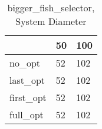 \begin{table}
\caption{bigger\_fish\_selector, System Diameter}
\label{bigger_fish_selector_diam}
\begin{tabular}{lll}
\toprule
 & 50 & 100 \\
\midrule
no\_opt & 52 & 102 \\
last\_opt & 52 & 102 \\
first\_opt & 52 & 102 \\
full\_opt & 52 & 102 \\
\bottomrule
\end{tabular}
\end{table}
